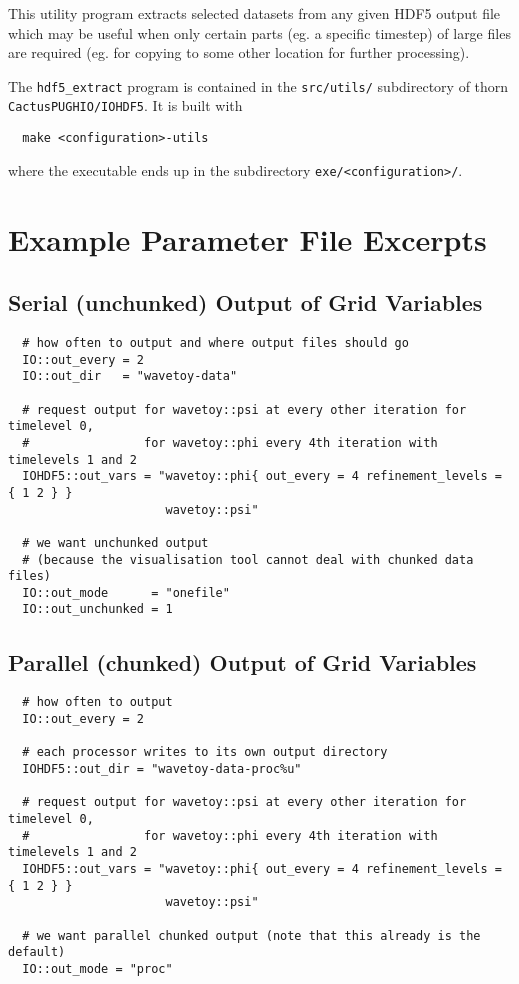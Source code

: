 \documentclass{article}
\begin{document}
This utility program extracts selected datasets from any given HDF5 output file
which may be useful when only certain parts (eg. a specific
timestep) of large files are required (eg. for copying to some other
location for further processing).

The {\tt hdf5\_extract} program is contained in the {\tt src/utils/}
subdirectory of thorn {\tt CactusPUGHIO/IOHDF5}. It is built with
\begin{verbatim}
  make <configuration>-utils
\end{verbatim}
where the executable ends up in the subdirectory {\tt exe/<configuration>/}.


\section{Example Parameter File Excerpts}

\subsection{Serial (unchunked) Output of Grid Variables}

\begin{verbatim}
  # how often to output and where output files should go
  IO::out_every = 2
  IO::out_dir   = "wavetoy-data"

  # request output for wavetoy::psi at every other iteration for timelevel 0,
  #                for wavetoy::phi every 4th iteration with timelevels 1 and 2
  IOHDF5::out_vars = "wavetoy::phi{ out_every = 4 refinement_levels = { 1 2 } }
                      wavetoy::psi"

  # we want unchunked output
  # (because the visualisation tool cannot deal with chunked data files)
  IO::out_mode      = "onefile"
  IO::out_unchunked = 1
\end{verbatim}

\subsection{Parallel (chunked) Output of Grid Variables}

\begin{verbatim}
  # how often to output
  IO::out_every = 2

  # each processor writes to its own output directory
  IOHDF5::out_dir = "wavetoy-data-proc%u"

  # request output for wavetoy::psi at every other iteration for timelevel 0,
  #                for wavetoy::phi every 4th iteration with timelevels 1 and 2
  IOHDF5::out_vars = "wavetoy::phi{ out_every = 4 refinement_levels = { 1 2 } }
                      wavetoy::psi"

  # we want parallel chunked output (note that this already is the default)
  IO::out_mode = "proc"
\end{verbatim}
\end{document}
